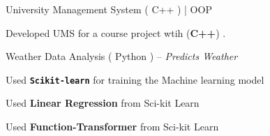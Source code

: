 



\begin{cventries}


  \cventry
    {University Management System ( C++ )  \textnormal{ | OOP }} %
    {} %
    {
      \begin{cvitems} %
        \item {Developed UMS for a course project wtih ({\bf C++}) .}
      \end{cvitems}
    }
    

\cventry
  {Weather Data Analysis ( Python )  \textnormal{-- \textit{Predicts Weather}}} %
  {} %
  {
    \begin{cvitems} %
      \item {Used \texttt{\textbf{Scikit-learn}} for training the Machine learning model}
      \item {Used \textbf{Linear Regression} from Sci-kit Learn}
      \item {Used \textbf{Function-Transformer} from Sci-kit Learn}
    \end{cvitems}
  }



\end{cventries}
